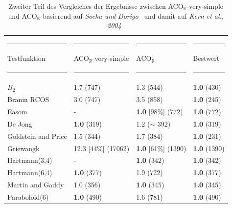 \documentclass[fontsize=12, a4aper]{scrartcl}
\begin{document}
	\begin{table}[H]
		
		\fontsize{10pt}{12pt}
		
		\caption{Zweiter Teil des Vergleiches der Ergebnisse zwischen ACO\(_{\mathbb{R}}\)-very-simple und ACO\(_{\mathbb{R}}\) basierend auf \textit{Socha und Dorigo}~\cite{socha2008ant} und damit auf \textit{Kern et al., 2004}~\cite{kern2004learning}}
		
		\label{VerglelichACORundACORVerySimpleTeil2}
		
		\begin{tabularx}{\textwidth}{l|l|l|l}
			
			\rule{3,55cm}{0.4pt} & \rule{3,45cm}{0.4pt} & \rule{3,45cm}{0.4pt} & \rule{3,45cm}{0.4pt}\\
			
			Testfunktion & ACO\(_{\mathbb{R}}\)-very-simple & ACO\(_{\mathbb{R}}\) & Bestwert\\
			
			\rule{3,55cm}{0.4pt} & \rule{3,45cm}{0.4pt} & \rule{3,45cm}{0.4pt} & \rule{3,45cm}{0.4pt}\\
			
			\(B_2\) & 1.7 (747) & 1.3 (544) & \textbf{1.0} (430)\\
			
			Branin RCOS & 3.0 (747) & 3.5 (858) & \textbf{1.0} (245)\\
			
			Easom & - & \textbf{1.0} [98\%] (772) & \textbf{1.0} (772)\\
			
			De Jong & \textbf{1.0} (319) & 1.2 ($\sim$ 392) & \textbf{1.0} (319)\\
			
			Goldstein and Price & 1.5 (344) & 1.7 (384) & \textbf{1.0} (231)\\
			
			Griewangk & 12.3 [44\%] (17062) & \textbf{1.0} [61\%] (1390) & \textbf{1.0} (1390)\\
			
			Hartmann(3,4) & - & \textbf{1.0} (342) & \textbf{1.0} (342)\\
			
			Hartmann(6,4) & \textbf{1.0} (377) & 1.9 (722) & \textbf{1.0} (377)\\
			
			Martin and Gaddy & 1.0 (356) & \textbf{1.0} (345) & \textbf{1.0} (345)\\
			
			Paraboloid(6) & \textbf{1.0} (490) & 1.6 (781) & \textbf{1.0} (490)\\
			

\end{tabularx}
\end{table}
\end{document}
